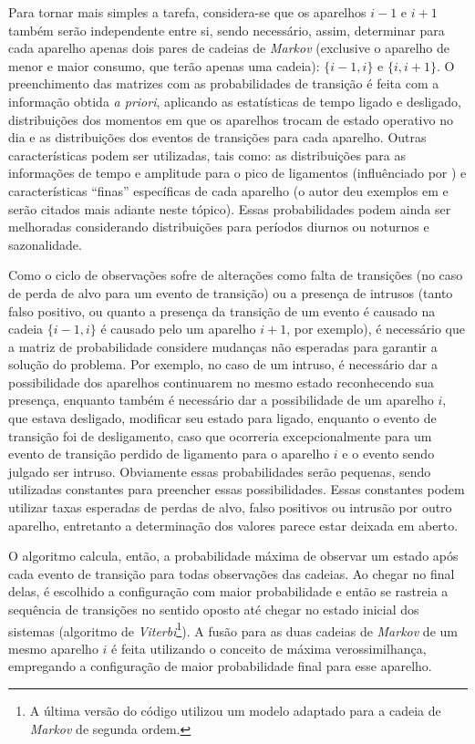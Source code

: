 \begin{enumerate}[label=\textbf{1.\arabic*},wide=\parindent]
Para tornar mais simples a tarefa, considera-se que os aparelhos $i-1$
e $i+1$ também serão independente entre si, sendo necessário, assim,
determinar para cada aparelho apenas dois pares de cadeias de
\emph{Markov} (exclusive o aparelho de menor e maior consumo, que
terão apenas uma cadeia): $\{i-1,i\}$ e $\{i,i+1\}$. O preenchimento das
matrizes com as probabilidades de transição é feita com a informação
obtida \emph{a priori}, aplicando as estatísticas de tempo ligado e
desligado, distribuições dos momentos em que os aparelhos trocam de
estado operativo no dia e as distribuições dos eventos de transições
para cada aparelho. Outras características podem ser utilizadas, tais
como: as distribuições para as informações de tempo e amplitude para o
pico de ligamentos (influênciado por
\cite{nilm_baranski_genetic_base_2003_19,
nilm_baranski_genetic_detalhado_2004_20,nilm_baranski_summary_2004_21})
e características ``finas'' específicas de cada aparelho (o autor deu
exemplos em \cite{nilm_zeifman_statistical_naive_enduses_2013} e serão
citados mais adiante neste tópico). Essas probabilidades podem ainda
ser melhoradas considerando distribuições para períodos diurnos ou
noturnos e sazonalidade.

Como o ciclo de observações sofre de alterações como falta
de transições (no caso de perda de alvo para um evento de transição)
ou a presença de intrusos (tanto falso positivo, ou quanto a presença
da transição de um evento é causado na cadeia $\{i-1,i\}$ é causado
pelo um aparelho $i+1$, por exemplo), é necessário que a matriz de
probabilidade considere mudanças não esperadas para garantir a solução
do problema. Por exemplo, no caso de um intruso, é necessário dar a
possibilidade dos aparelhos continuarem no mesmo estado reconhecendo
sua presença, enquanto também é necessário dar a possibilidade de um aparelho
$i$, que estava desligado, modificar seu estado para ligado, enquanto
o evento de transição foi de desligamento, caso que ocorreria
excepcionalmente para um evento de transição perdido de ligamento para
o aparelho $i$ e o evento sendo julgado ser intruso. Obviamente essas
probabilidades serão pequenas, sendo utilizadas constantes para
preencher essas possibilidades. Essas constantes podem utilizar taxas
esperadas de perdas de alvo, falso positivos ou intrusão por outro
aparelho, entretanto a determinação dos valores parece estar deixada
em aberto.

O algoritmo calcula, então, a probabilidade máxima de observar um
estado após cada evento de transição para todas observações das
cadeias. Ao chegar no final delas, é escolhido a configuração com
maior probabilidade e então se rastreia a sequência de transições no
sentido oposto até chegar no estado inicial dos sistemas (algoritmo de
\emph{Viterbi}\footnote{A última versão do código utilizou um modelo
adaptado para a cadeia de \emph{Markov} de segunda ordem.}). A fusão
para as duas cadeias de \emph{Markov} de um mesmo aparelho $i$ é feita
utilizando o conceito de máxima verossimilhança, empregando a
configuração de maior probabilidade final para esse aparelho.


\end{enumerate}

